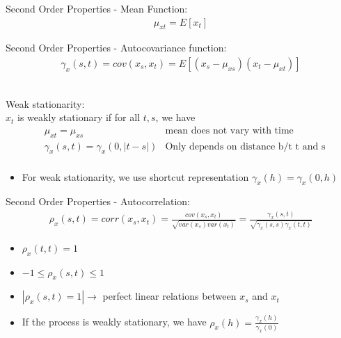 Second Order Properties - Mean Function: \\
    \begin{align*}
        \mu_{xt} = E[x_t]
    \end{align*}
\par

Second Order Properties - Autocovariance function: 
    \begin{align*}
        \gamma_x(s,t) = cov(x_s, x_t) = E[(x_s - \mu_{xs})(x_t - \mu_{xt})]
    \end{align*}\\
\par

Weak stationarity: \\
$x_{t}$ is weakly stationary if for all $t, s$, we have 
    \begin{align*}
        & \mu_{xt} = \mu_{xs} & \textrm{mean does not vary with time}\\
        & \gamma_x(s,t) = \gamma_x(0, |t-s|) & \textrm{Only depends on distance b/t t and s} \\ 
    \end{align*}
    \begin{itemize}
        \item For weak stationarity, we use shortcut representation  $\gamma_x(h) = \gamma_x(0, h)$
    \end{itemize}
\par

Second Order Properties - Autocorrelation: \\
    \begin{align*}
        \rho_x(s,t) = corr(x_s, x_t) = \frac{cov(x_s, x_t)}{\sqrt{var(x_s)var(x_t)}} = \frac{\gamma_x(s,t)}{\sqrt{\gamma_x(s,s) \gamma_x(t,t)}}
    \end{align*}

    \begin{itemize}
        \item $\rho_x(t,t) = 1$
        \item  $ -1 \leq \rho_x(s,t) \leq 1$
        \item $|\rho_x(s,t) = 1| \rightarrow $ perfect linear relations between $x_s$ and $x_t$
        \item If the process is weakly stationary, we have $\rho_x(h) = \frac{\gamma_x(h)}{\gamma_x(0)}$
        
    \end{itemize}



